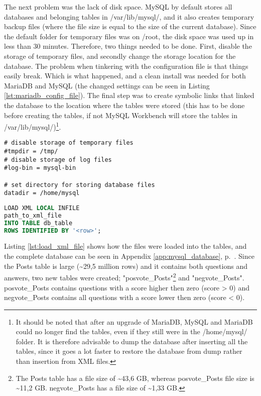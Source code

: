 \noindent
The next problem was the lack of disk space. 
MySQL by default stores all databases and belonging tables in /var/lib/mysql/, and it also creates temporary backup files 
(where the file size is equal to the size of the current database). 
Since the default folder for temporary files was on /root, the disk space was used up in less than 30 minutes. 
Therefore, two things needed to be done. First, disable the storage of temporary files, and secondly change the storage location for the database. 
The problem when tinkering with the configuration file is that things easily break. 
Which is what happened, and a clean install was needed for both MariaDB and MySQL (the changed settings can be seen in Listing  \ref{lst:mariadb_config_file}). 
The final step was to create symbolic links that linked the database to the  location where the tables were stored 
(this has to be done before creating the tables, if not MySQL  Workbench will store the tables in /var/lib/mysql/)\footnote{
	It should be noted that after an upgrade of MariaDB, MySQL and MariaDB could no longer find the tables, even if they still were in the /home/mysql/ folder. 
	It is therefore advisable to dump the database after inserting all the tables, since it goes a lot faster to restore the database from dump rather than insertion from XML files.
	}. 
\begin{lstlisting}[caption={Changes made to config file: /etc/mysql/my.cnf}, label={lst:mariadb_config_file}] 
# disable storage of temporary files
#tmpdir = /tmp/		  
# disable storage of log files
#log-bin = mysql-bin  

# set directory for storing database files
datadir = /home/mysql 
\end{lstlisting}

\begin{lstlisting}[caption={Load XML file into a table in the MySQL database}, label={lst:load_xml_file}, language={SQL}] 
LOAD XML LOCAL INFILE 
path_to_xml_file
INTO TABLE db_table
ROWS IDENTIFIED BY '<row>';
\end{lstlisting}

\noindent
Listing \ref{lst:load_xml_file} shows how the files were loaded into the tables, and the complete database can be seen in Appendix \ref{app:mysql_database}, p.~\pageref{app:mysql_database}. 
Since the Posts table is large (\textasciitilde 29,5 million rows) and it contains both questions and answers, two new tables were created; 
"posvote\_Posts"\footnote{
	The Posts table has a file size of \textasciitilde 43,6 GB, 
	whereas posvote\_Posts file size is \textasciitilde 11,2 GB. 
	negvote\_Posts has a file size of \textasciitilde 1,33 GB.
	} 
and "negvote\_Posts". 
posvote\_Posts contains questions with a score higher then zero (score > 0) and negvote\_Posts contains all questions with a score lower then zero (score < 0).




